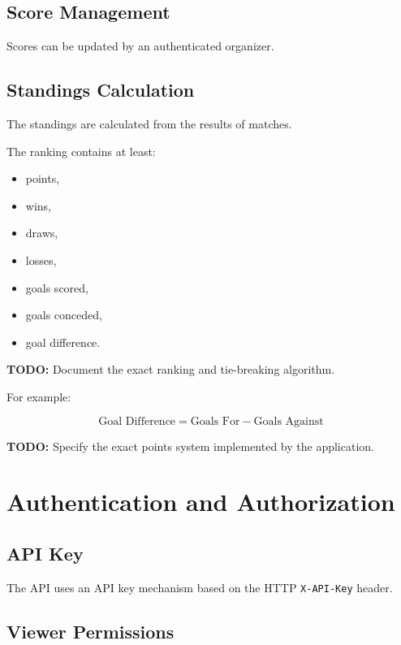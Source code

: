 \documentclass[12pt,a4paper]{article}
\begin{document}
\subsection{Score Management}

Scores can be updated by an authenticated organizer.

\subsection{Standings Calculation}

The standings are calculated from the results of matches.

The ranking contains at least:

\begin{itemize}
    \item points,
    \item wins,
    \item draws,
    \item losses,
    \item goals scored,
    \item goals conceded,
    \item goal difference.
\end{itemize}

\textbf{TODO:} Document the exact ranking and tie-breaking algorithm.

For example:

\[
\text{Goal Difference}
=
\text{Goals For}
-
\text{Goals Against}
\]

\textbf{TODO:} Specify the exact points system implemented by the
application.


\section{Authentication and Authorization}

\subsection{API Key}

The API uses an API key mechanism based on the HTTP
\texttt{X-API-Key} header.

\subsection{Viewer Permissions}
\end{document}
